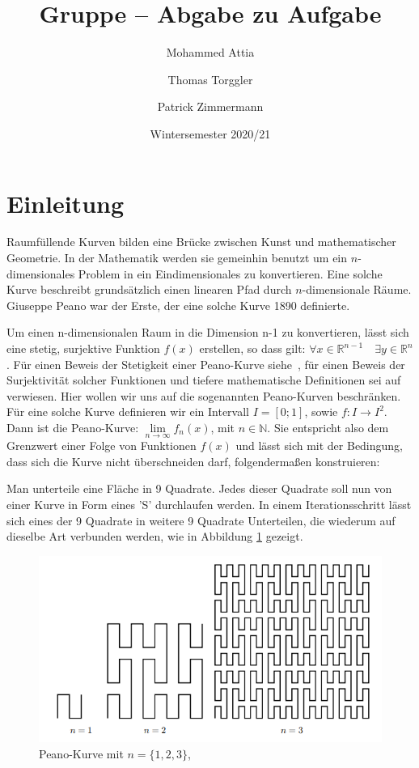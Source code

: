 \documentclass[course=asp]{aspdoc}
\author{Mohammed Attia \and Thomas Torggler \and Patrick Zimmermann}
\date{Wintersemester 2020/21} %
\title{Gruppe \theGroup{} -- Abgabe zu Aufgabe \theNumber}
\begin{document}
\maketitle

\newpage
\section{Einleitung} \label{Einleitung}

Raumf\"ullende Kurven bilden eine Br\"ucke zwischen Kunst und mathematischer Geometrie. In der Mathematik werden sie gemeinhin benutzt um ein $n$-dimensionales Problem in ein Eindimensionales zu konvertieren. Eine solche Kurve beschreibt grunds\"atzlich einen linearen Pfad durch $n$-dimensionale R\"aume. Giuseppe Peano war der Erste, der eine solche Kurve 1890 definierte.

Um einen n-dimensionalen Raum in die Dimension n-1 zu konvertieren, l\"asst sich eine stetig, surjektive Funktion $f(x)$ erstellen, so dass gilt: $\forall x \in \mathbb{R}^{n-1} \quad \exists y \in \mathbb{R}^n$. F\"ur einen Beweis der Stetigkeit einer Peano-Kurve siehe~\cite{stetigkeitsBeweis}, f\"ur einen Beweis der Surjektivit\"at solcher Funktionen und tiefere mathematische Definitionen sei auf ~\cite{surjektivBeweis} verwiesen. Hier wollen wir uns auf die sogenannten Peano-Kurven beschr\"anken. F\"ur eine solche Kurve definieren wir ein Intervall $I = [0;1]$, sowie  $f: I \rightarrow I^2 $. Dann ist die Peano-Kurve: $\lim\limits_{n \to \infty}f_n(x)$, mit $n \in \mathbb{N}$. Sie entspricht also dem Grenzwert einer Folge von Funktionen $f(x)$ und l\"asst sich mit der Bedingung, dass sich die Kurve nicht \"uberschneiden darf, folgenderma\ss en konstruieren:

Man unterteile eine Fl\"ache in 9 Quadrate. Jedes dieser Quadrate soll nun von einer Kurve in Form eines 'S' durchlaufen werden.
In einem Iterationsschritt l\"asst sich eines der 9 Quadrate in weitere 9 Quadrate Unterteilen, die wiederum auf dieselbe Art verbunden werden, wie in Abbildung \ref{Abb:Peano} gezeigt.

\begin{figure} [ht] %
\centering
\includegraphics[scale=0.9]{PeanoBsp.png}
\caption{Peano-Kurve mit $n = \{1, 2, 3\}$, ~\cite{aufgabenstellung}}\label{Abb:Peano}
\end{figure}
\end{document}
